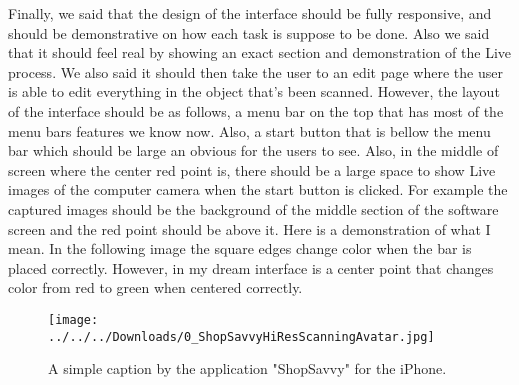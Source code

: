 \documentclass[12pt, oneside]{amsart}   	%
\begin{document}
Finally, we said that the design of the interface should be fully responsive, and should be demonstrative on how each task is suppose to be done.  Also we said that it should feel real by showing an exact section and demonstration of the Live process.  We also said it should then take the user to an edit page where the user is able to edit everything in the object that's been scanned.  However, the layout of the interface should be as follows, a menu bar on the top that has most of the menu bars features we know now.  Also, a start button that is bellow the menu bar which should be large an obvious for the users to see.  Also, in the middle of screen where the center red point is, there should be a large space to show Live images of the computer camera when the start button is clicked.  For example the captured images should be the background of the middle section of the software screen and the red point should be above it.  Here is a demonstration of what I mean. In the following image the square edges change color when the bar is placed correctly. However, in my dream interface is a center point that changes color from red to green when centered correctly.

\begin{figure}[!h]
\centering
\texttt{[image: ../../../Downloads/0\_ShopSavvyHiResScanningAvatar.jpg]}
\caption{A simple caption by the application "ShopSavvy" for the iPhone. \cite{LastImage}}
\label{overflow}
\end{figure}
\end{document}
